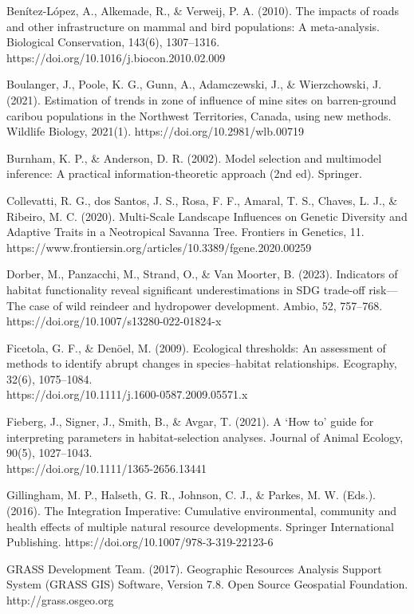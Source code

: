 \documentclass[titlepage]{article}
\begin{document}
Benítez-López, A., Alkemade, R., & Verweij, P. A. (2010). The impacts of roads and other infrastructure on mammal and bird populations: A meta-analysis. Biological Conservation, 143(6), 1307–1316.\\ https://doi.org/10.1016/j.biocon.2010.02.009

Boulanger, J., Poole, K. G., Gunn, A., Adamczewski, J., & Wierzchowski, J. (2021). Estimation of trends in zone of influence of mine sites on barren-ground caribou populations in the Northwest Territories, Canada, using new methods. Wildlife Biology, 2021(1). https://doi.org/10.2981/wlb.00719

Burnham, K. P., & Anderson, D. R. (2002). Model selection and multimodel inference: A practical information-theoretic approach (2nd ed). Springer.

Collevatti, R. G., dos Santos, J. S., Rosa, F. F., Amaral, T. S., Chaves, L. J., & Ribeiro, M. C. (2020). Multi-Scale Landscape Influences on Genetic Diversity and Adaptive Traits in a Neotropical Savanna Tree. Frontiers in Genetics, 11. https://www.frontiersin.org/articles/10.3389/fgene.2020.00259

Dorber, M., Panzacchi, M., Strand, O., & Van Moorter, B. (2023). Indicators of habitat functionality reveal significant underestimations in SDG trade-off risk—The case of wild reindeer and hydropower development. Ambio, 52, 757–768. https://doi.org/10.1007/s13280-022-01824-x

Ficetola, G. F., & Denöel, M. (2009). Ecological thresholds: An assessment of methods to identify abrupt changes in species–habitat relationships. Ecography, 32(6), 1075–1084.\\ https://doi.org/10.1111/j.1600-0587.2009.05571.x

Fieberg, J., Signer, J., Smith, B., & Avgar, T. (2021). A ‘How to’ guide for interpreting parameters in habitat‐selection analyses. Journal of Animal Ecology, 90(5), 1027–1043.\\ https://doi.org/10.1111/1365-2656.13441

Gillingham, M. P., Halseth, G. R., Johnson, C. J., & Parkes, M. W. (Eds.). (2016). The Integration Imperative: Cumulative environmental, community and health effects of multiple natural resource developments. Springer International Publishing. https://doi.org/10.1007/978-3-319-22123-6

GRASS Development Team. (2017). Geographic Resources Analysis Support System (GRASS GIS) Software, Version 7.8. Open Source Geospatial Foundation. http://grass.osgeo.org
\end{document}
